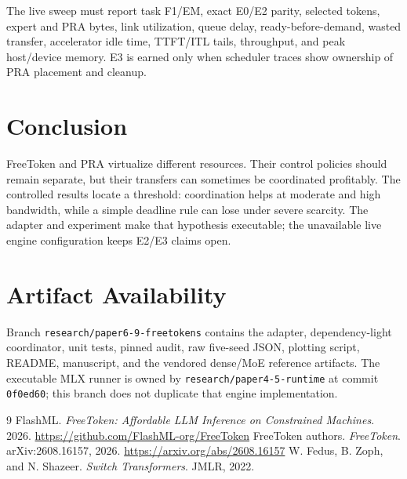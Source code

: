 \documentclass[10pt]{article}
\begin{document}
The live sweep must report task F1/EM, exact E0/E2 parity, selected tokens,
expert and PRA bytes, link utilization, queue delay, ready-before-demand,
wasted transfer, accelerator idle time, TTFT/ITL tails, throughput, and peak
host/device memory. E3 is earned only when scheduler traces show ownership of
PRA placement and cleanup.

\section{Conclusion}
FreeToken and PRA virtualize different resources. Their control policies should
remain separate, but their transfers can sometimes be coordinated profitably.
The controlled results locate a threshold: coordination helps at moderate and
high bandwidth, while a simple deadline rule can lose under severe scarcity.
The adapter and experiment make that hypothesis executable; the unavailable
live engine configuration keeps E2/E3 claims open.

\section*{Artifact Availability}
Branch \texttt{research/paper6-9-freetokens} contains the adapter, dependency-light
coordinator, unit tests, pinned audit, raw five-seed JSON, plotting script,
README, manuscript, and the vendored dense/MoE reference artifacts. The
executable MLX runner is owned by \texttt{research/paper4-5-runtime} at commit
\texttt{0f0ed60}; this branch does not duplicate that engine implementation.

\begin{thebibliography}{9}
\scriptsize
{} FlashML. \emph{FreeToken: Affordable LLM Inference on
Constrained Machines}. 2026. \url{https://github.com/FlashML-org/FreeToken}
 FreeToken authors. \emph{FreeToken}. arXiv:2608.16157,
2026. \url{https://arxiv.org/abs/2608.16157}
 W. Fedus, B. Zoph, and N. Shazeer. \emph{Switch Transformers}.
JMLR, 2022.
\end{thebibliography}
\end{document}
